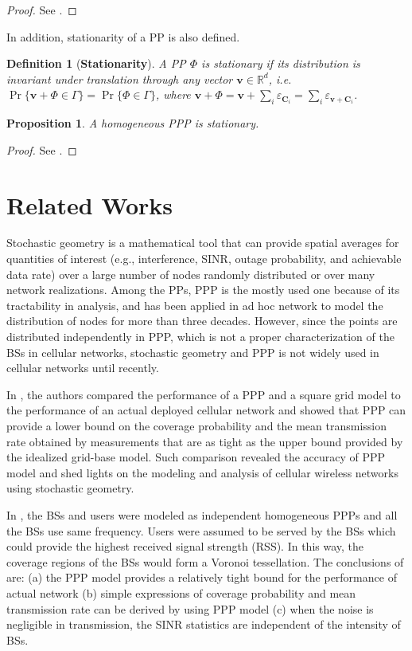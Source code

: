\documentclass[a4paper,twocolumn]{IEEEtran}
\newtheorem{definition}{\textbf{Definition}}
\newtheorem{proposition}{\textbf{Proposition}}
\begin{document}
\begin{proof}
See \cite[Theorem 1.4.5]{Baccelli2009Vol1}.
\end{proof}
In addition, stationarity of a PP is also defined.
\begin{definition}[\textbf{Stationarity}]
A PP $\Phi$ is stationary if its distribution is invariant under translation through any vector $\bm{v}\in\mathbb{R}^d$, i.e. $\Pr\{\bm{v}+\Phi \in \Gamma\}=\Pr\{\Phi \in \Gamma\}$, where $\bm{v}+\Phi=\bm{v}+\sum_i \varepsilon_{\bm{C}_i} = \sum_i \varepsilon_{\bm{v}+\bm{C}_i}$.
\end{definition}
\begin{proposition}
A homogeneous PPP is stationary.
\end{proposition}
\begin{proof}
See \cite[Proposition 1.6.2]{Baccelli2009Vol1}.
\end{proof}

\section{Related Works}\label{Sec:Rel}
Stochastic geometry is a mathematical tool that can provide spatial averages for quantities of interest (e.g., interference, SINR, outage probability, and achievable data rate) over a large number of nodes randomly distributed or over many network realizations\cite{Haenggi2009JSAC}. Among the PPs, PPP is the mostly used one because of its tractability in analysis, and has been applied in ad hoc network to model the distribution of nodes for more than three decades\cite{Kleinrock1978}. However, since the points are distributed independently in PPP, which is not a proper characterization of the BSs in cellular networks, stochastic geometry and PPP is not widely used in cellular networks until recently.     

In \cite{Andrews2011TC}, the authors compared the performance of a PPP and a square grid model to the performance of an actual deployed cellular network and showed that PPP can provide a lower bound on the coverage probability and the mean transmission rate obtained by measurements that are as tight as the upper bound provided by the idealized grid-base model. Such comparison revealed the accuracy of PPP model and shed lights on the modeling and analysis of cellular wireless networks using stochastic geometry.

In \cite{Andrews2011TC}, the BSs and users were modeled as independent homogeneous PPPs and all the BSs use same frequency. Users were assumed to be served by the BSs which could provide the highest received signal strength (RSS). In this way, the coverage regions of the BSs would form a Voronoi tessellation\cite{Okabe1992}. The conclusions of \cite{Andrews2011TC} are: (a) the PPP model provides a relatively tight bound for the performance of actual network (b) simple expressions of coverage probability and mean transmission rate can be derived by using PPP model (c) when the noise is negligible in transmission, the SINR statistics are independent of the intensity of BSs.
\end{document}
